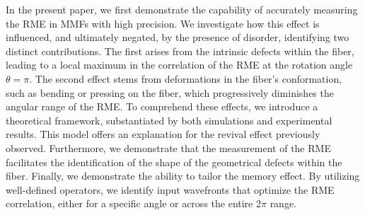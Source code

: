 \documentclass[aps,prl,twocolumn, amsmath,amssymb,superscriptaddress]{revtex4-2}
\begin{document}

In the present paper,
we first demonstrate the capability of accurately measuring the RME
in MMFs with high precision.
We investigate how this effect is influenced, 
and ultimately negated, by the presence of disorder,
identifying two distinct contributions.
The first arises from the intrinsic defects within the fiber,
leading to a local maximum in the correlation of the RME
at the rotation angle $\theta = \pi$.
The second effect stems from deformations in the fiber's conformation,
such as bending or pressing on the fiber,
which progressively diminishes the angular range of the RME.
To comprehend these effects,
we introduce a theoretical framework, substantiated by both simulations
and experimental results. 
This model offers an explanation for the revival effect previously observed.
Furthermore, we demonstrate that the measurement of the RME facilitates
the identification of the shape of the geometrical defects within the fiber.
Finally, we demonstrate the ability to tailor the memory effect.
By utilizing well-defined operators, we identify input wavefronts that
optimize the RME correlation, either for a specific angle or across the entire $2\pi$ range.
\end{document}
